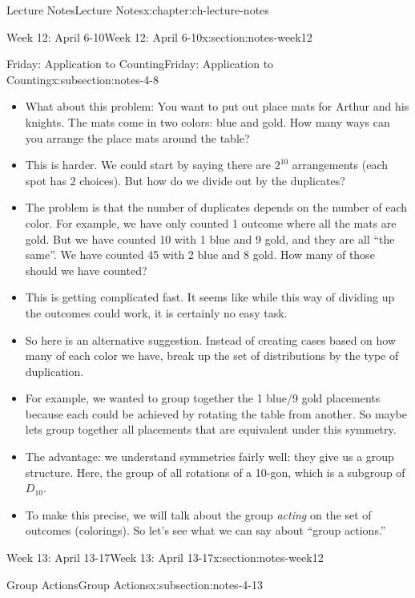 \documentclass[oneside,11pt,]{book}
\begin{document}
\begin{chapterptx}{Lecture Notes}{}{Lecture Notes}{}{}{x:chapter:ch-lecture-notes}
\begin{sectionptx}{Week 12: April 6-10}{}{Week 12: April 6-10}{}{}{x:section:notes-week12}
\begin{subsectionptx}{Friday: Application to Counting}{}{Friday: Application to Counting}{}{}{x:subsection:notes-4-8}
\begin{itemize}[label=\textbullet]
\item{}What about this problem: You want to put out place mats for Arthur and his knights. The mats come in two colors: blue and gold. How many ways can you arrange the place mats around the table?%
\item{}This is harder. We could start by saying there are \(2^{10}\) arrangements (each spot has 2 choices). But how do we divide out by the duplicates?%
\item{}The problem is that the number of duplicates depends on the number of each color. For example, we have only counted 1 outcome where all the mats are gold. But we have counted 10 with 1 blue and 9 gold, and they are all ``the same''. We have counted 45 with 2 blue and 8 gold. How many of those should we have counted?%
\item{}This is getting complicated fast. It seems like while this way of dividing up the outcomes could work, it is certainly no easy task.%
\item{}So here is an alternative suggestion. Instead of creating cases based on how many of each color we have, break up the set of distributions by the type of duplication.%
\item{}For example, we wanted to group together the 1 blue\slash{}9 gold placements because each could be achieved by rotating the table from another. So maybe lets group together all placements that are equivalent under this symmetry.%
\item{}The advantage: we understand symmetries fairly well: they give us a group structure. Here, the group of all rotations of a 10-gon, which is a subgroup of \(D_{10}\).%
\item{}To make this precise, we will talk about the group \emph{acting} on the set of outcomes (colorings). So let’s see what we can say about ``group actions.''%
\end{itemize}
%
\end{subsectionptx}
\end{sectionptx}
%
%
\typeout{************************************************}
\typeout{************************************************}
%
\begin{sectionptx}{Week 13: April 13-17}{}{Week 13: April 13-17}{}{}{x:section:notes-week12}
%
%
\typeout{************************************************}
\typeout{************************************************}
%
\begin{subsectionptx}{Group Actions}{}{Group Actions}{}{}{x:subsection:notes-4-13}

\end{subsectionptx}
\end{sectionptx}
\end{chapterptx}
\end{document}

